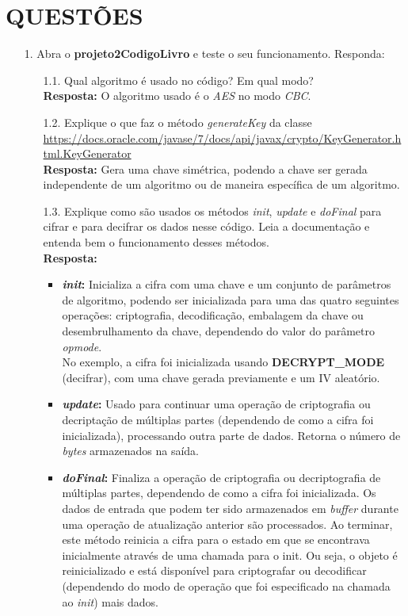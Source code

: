 \documentclass[12pt,a4paper]{article}
\newcommand{\link}[1]{{\color{blue}\url{#1}}}
\begin{document}
	\section{\normalsize QUESTÕES}
		\begin{enumerate}
			\item[1.] Abra o \textbf{projeto2CodigoLivro} e teste o seu funcionamento. Responda:
			
			\begin{enumerate}
				\item[1.1.] Qual algoritmo é usado no código? Em qual modo?\\
				\textbf{Resposta:} O algoritmo usado é o \textit{AES} no modo \textit{CBC}.
				
				\item[1.2.] Explique o que faz o método \textit{generateKey} da classe \link{https://docs.oracle.com/javase/7/docs/api/javax/crypto/KeyGenerator.html.KeyGenerator}\\
				\textbf{Resposta:} Gera uma chave simétrica, podendo a chave ser gerada independente de um algoritmo ou de maneira específica de um algoritmo.
				
				\item[1.3.] Explique como são usados os métodos \textit{init}, \textit{update} e \textit{doFinal} para cifrar e para decifrar os dados nesse código. Leia a documentação e entenda bem o funcionamento desses métodos.\\
				\textbf{Resposta:}\\
				\begin{itemize}
					\item \textbf{\textit{init}:} Inicializa a cifra com uma chave e um conjunto de parâmetros de algoritmo, podendo ser inicializada para uma das quatro seguintes operações: criptografia, decodificação, embalagem da chave ou desembrulhamento da chave, dependendo do valor do parâmetro \textit{opmode}.\\
					No exemplo, a cifra foi inicializada usando \textbf{DECRYPT\_MODE} (decifrar), com uma chave gerada previamente e um IV aleatório. 
					
					\item \textbf{\textit{update}:} Usado para continuar uma operação de criptografia ou decriptação de múltiplas partes (dependendo de como a cifra foi inicializada), processando outra parte de dados. Retorna o número de \textit{bytes} armazenados na saída.
					
					\item \textbf{\textit{doFinal}:} Finaliza a operação de criptografia ou decriptografia de múltiplas partes,  dependendo de como a cifra foi inicializada. Os dados de entrada que podem ter sido armazenados em \textit{buffer} durante uma operação de atualização anterior são processados. Ao terminar, este método reinicia a cifra para o estado em que se encontrava inicialmente através de uma chamada para o init. Ou seja, o objeto é reinicializado e está disponível para criptografar ou decodificar (dependendo do modo de operação que foi especificado na chamada ao \textit{init}) mais dados.
				\end{itemize}
			\end{enumerate}
			

\end{enumerate}
\end{document}
